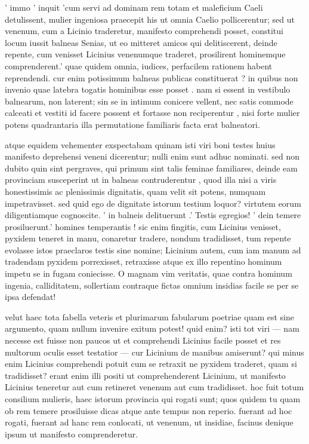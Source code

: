  ' immo ' inquit 'cum servi ad dominam rem totam et maleficium Caeli detulissent, mulier ingeniosa praecepit his ut omnia Caelio pollicerentur; sed ut venenum, cum a Licinio traderetur, manifesto comprehendi posset, constitui locum iussit balneas Senias, ut eo mitteret amicos qui delitiscerent, deinde repente, cum venisset Licinius venenumque traderet, prosilirent hominemque comprenderent.' quae quidem omnia, iudices, perfacilem rationem habent reprendendi. cur enim potissimum balneas publicas constituerat ? in quibus non invenio quae latebra togatis hominibus esse posset . nam si essent in vestibulo balnearum, non laterent; sin se in intimum conicere vellent, nec satis commode calceati et vestiti id facere possent et fortasse non reciperentur , nisi forte mulier potens quadrantaria illa permutatione familiaris facta erat balneatori.

 atque equidem vehementer exspectabam quinam isti viri boni testes huius manifesto deprehensi veneni dicerentur; nulli enim sunt adhuc nominati. sed non dubito quin sint pergraves, qui primum sint talis feminae familiares, deinde eam provinciam susceperint ut in balneas contruderentur , quod illa nisi a viris honestissimis ac plenissimis dignitatis, quam velit sit potens, numquam impetravisset. sed quid ego de dignitate istorum testium loquor? virtutem eorum diligentiamque cognoscite. ' in balneis delituerunt .' Testis egregios! ' dein temere prosiluerunt.' homines temperantis ! sic enim fingitis, cum Licinius venisset, pyxidem teneret in manu, conaretur tradere, nondum tradidisset, tum repente evolasse istos praeclaros testis sine nomine; Licinium autem, cum iam manum ad tradendam pyxidem porrexisset, retraxisse atque ex illo repentino hominum impetu se in fugam coniecisse. O magnam vim veritatis, quae contra hominum ingenia, calliditatem, sollertiam contraque fictas omnium insidias facile se per se ipsa defendat!

 velut haec tota fabella veteris et plurimarum fabularum poetriae quam est sine argumento, quam nullum invenire exitum potest! quid enim? isti tot viri — nam necesse est fuisse non paucos ut et comprehendi Licinius facile posset et res multorum oculis esset testatior — cur Licinium de manibus amiserunt? qui minus enim Licinius comprehendi potuit cum se retraxit ne pyxidem traderet, quam si tradidisset? erant enim illi positi ut comprehenderent Licinium, ut manifesto Licinius teneretur aut cum retineret venenum aut cum tradidisset. hoc fuit totum consilium mulieris, haec istorum provincia qui rogati sunt; quos quidem tu quam ob rem temere prosiluisse dicas atque ante tempus non reperio. fuerant ad hoc rogati, fuerant ad hanc rem conlocati, ut venenum, ut insidiae, facinus denique ipsum ut manifesto comprenderetur.

